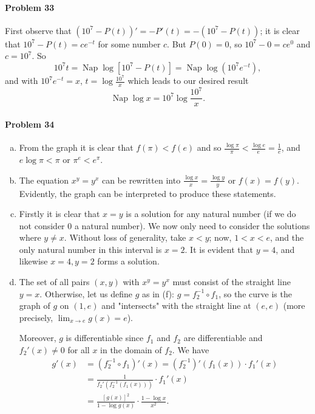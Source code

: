 \documentclass{article}
\DeclareMathOperator{\Nap}{Nap}
\begin{document}
\paragraph{Problem 33} First observe that $(10^7 - P(t))' = -P'(t) = -(10^7 -
P(t))$; it is clear that $10^7 - P(t) = ce^{-t}$ for some number $c$. But
$P(0) = 0$, so $10^7 - 0 = ce^0$ and $c = 10^7$. So \[
  10^7t = \Nap\log[10^7 - P(t)] = \Nap\log(10^7e^{-t}),
\] and with $10^7e^{-t} = x$, $t = \log\frac{10^7}{x}$ which leads to our
desired result \[
  \Nap\log x = 10^7\log\frac{10^7}{x}.
\]

\paragraph{Problem 34}
\begin{enumerate}[(b)]
  \item From the graph it is clear that $f(\pi) < f(e)$ and so
    $\frac{\log\pi}{\pi} < \frac{\log e}{e} = \frac{1}{e}$, and $e\log\pi <
    \pi$ or $\pi^e < e^{\pi}$.
  \item The equation $x^y = y^x$ can be rewritten into $\frac{\log x}{x} =
    \frac{\log y}{y}$ or $f(x) = f(y)$. Evidently, the graph can be interpreted
    to produce these statements.
  \item Firstly it is clear that $x = y$ is a solution for any natural number
    (if we do not consider 0 a natural number). We now only need to consider
    the solutions where $y \neq x$. Without loss of generality, take $x < y$;
    now, $1 < x < e$, and the only natural number in this interval is $x = 2$.
    It is evident that $y = 4$, and likewise $x = 4, y = 2$ forms a solution.
  \item The set of all pairs $(x, y)$ with $x^y = y^x$ must consist of the
    straight line $y = x$. Otherwise, let us define $g$ as in (f): $g =
    f_2^{-1} \circ f_1$, so the curve is the graph of $g$ on $(1, e)$ and
    "intersects" with the straight line at $(e, e)$ (more precisely,
    $\lim_{x \to e}g(x) = e$).

    Moreover, $g$ is differentiable since $f_1$ and $f_2$ are differentiable
    and $f_2'(x) \neq 0$ for all $x$ in the domain of $f_2$. We have
    \begin{align*}
      g'(x) &= (f_2^{-1} \circ f_1)'(x) = (f_2^{-1})'(f_1(x)) \cdot f_1'(x) \\
            &= \frac{1}{f_2'(f_2^{-1}(f_1(x)))} \cdot f_1'(x) \\
            &= \frac{[g(x)]^2}{1 - \log g(x)} \cdot \frac{1 - \log x}{x^2}.
    \end{align*}
\end{enumerate}
\end{document}
